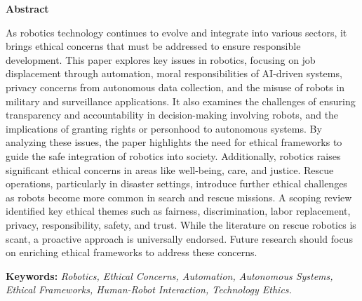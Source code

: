 
\begin{center}
	{\huge \bf Abstract}
\end{center}
As robotics technology continues to evolve and integrate into various sectors, it brings ethical concerns that must be addressed to ensure responsible development. This paper explores key issues in robotics, focusing on job displacement through automation, moral responsibilities of AI-driven systems, privacy concerns from autonomous data collection, and the misuse of robots in military and surveillance applications. It also examines the challenges of ensuring transparency and accountability in decision-making involving robots, and the implications of granting rights or personhood to autonomous systems. By analyzing these issues, the paper highlights the need for ethical frameworks to guide the safe integration of robotics into society. Additionally, robotics raises significant ethical concerns in areas like well-being, care, and justice. Rescue operations, particularly in disaster settings, introduce further ethical challenges as robots become more common in search and rescue missions. A scoping review identified key ethical themes such as fairness, discrimination, labor replacement, privacy, responsibility, safety, and trust. While the literature on rescue robotics is scant, a proactive approach is universally endorsed. Future research should focus on enriching ethical frameworks to address these concerns.


\vspace{1cm}

\noindent \textbf{Keywords:}  \textit{Robotics, Ethical Concerns, Automation, Autonomous Systems, Ethical Frameworks, Human-Robot Interaction, Technology Ethics.}



\clearpage
\setlength{\headheight}{12pt}